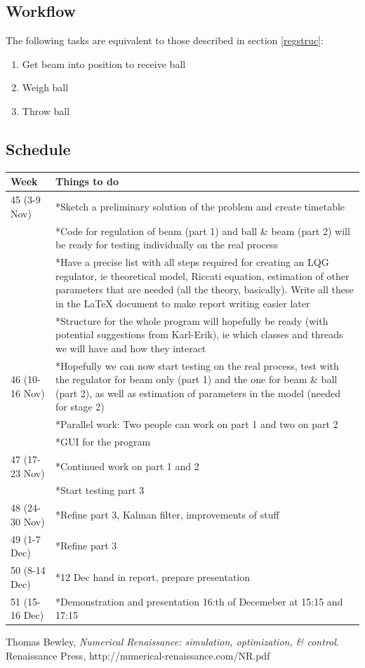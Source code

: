 \documentclass{article}
\begin{document}
\subsection{Workflow}
The following tasks are equivalent to those described in section \ref{regstruc}:
\begin{enumerate}
	\item Get beam into position to receive ball
	\item Weigh ball
	\item Throw ball
\end{enumerate}
\subsection{Schedule}
\begin{tabular}[h]{|l|p{10cm}|}
\hline
Week & Things to do \\ \hline
45 (3-9 Nov) & *Sketch a preliminary solution of the problem and create timetable \\
 & *Code for regulation of beam (part 1) and ball \& beam (part 2) will be ready for testing individually on the real process  \\
 & *Have a precise list with all steps required for creating an LQG regulator, ie theoretical model, Riccati equation, estimation of other parameters that are needed (all the theory, basically). Write all these in the LaTeX document to make report writing easier later \\
 & *Structure for the whole program will hopefully be ready (with potential suggestions from Karl-Erik), ie which classes and threads we will have and how they interact \\
\hline
46 (10-16 Nov) & *Hopefully we can now start testing on the real process, test with the regulator for beam only (part 1) and the one for beam \& ball (part 2), as well as estimation of parameters in the model (needed for stage 2) \\
 & *Parallel work: Two people can work on part 1 and two on part 2 \\
 & *GUI for the program \\
\hline
47 (17-23 Nov) & *Continued work on part 1 and 2 \\
 & *Start testing part 3 \\
\hline
48 (24-30 Nov) & *Refine part 3, Kalman filter, improvements of stuff \\
\hline
49 (1-7 Dec) & *Refine part 3 \\
\hline
50 (8-14 Dec) & *12 Dec hand in report, prepare presentation \\
\hline
51 (15-16 Dec) & *Demonstration and presentation 16:th of Decemeber at 15:15 and 17:15 \\
\hline

\end{tabular}

\newpage
\begin{thebibliography}{9}
  Thomas Bewley,
  \emph{Numerical Renaissance: simulation, optimization, \& control}.
  Renaissance Press,
  http://numerical-renaissance.com/NR.pdf

\end{thebibliography}
\end{document}
